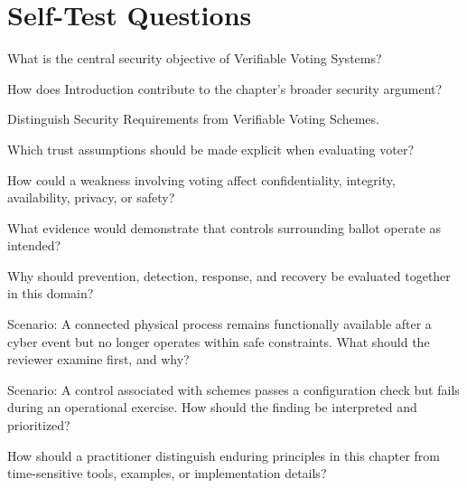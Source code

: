 \documentclass[11pt,letterpaper]{article}
\begin{document}
\section*{Self-Test Questions}
\begin{CornellRecallList}
\item What is the central security objective of Verifiable Voting Systems?
\item How does Introduction contribute to the chapter's broader security argument?
\item Distinguish Security Requirements from Verifiable Voting Schemes.
\item Which trust assumptions should be made explicit when evaluating voter?
\item How could a weakness involving voting affect confidentiality, integrity, availability, privacy, or safety?
\item What evidence would demonstrate that controls surrounding ballot operate as intended?
\item Why should prevention, detection, response, and recovery be evaluated together in this domain?
\item Scenario: A connected physical process remains functionally available after a cyber event but no longer operates within safe constraints. What should the reviewer examine first, and why?
\item Scenario: A control associated with schemes passes a configuration check but fails during an operational exercise. How should the finding be interpreted and prioritized?
\item How should a practitioner distinguish enduring principles in this chapter from time-sensitive tools, examples, or implementation details?
\end{CornellRecallList}
\end{document}
